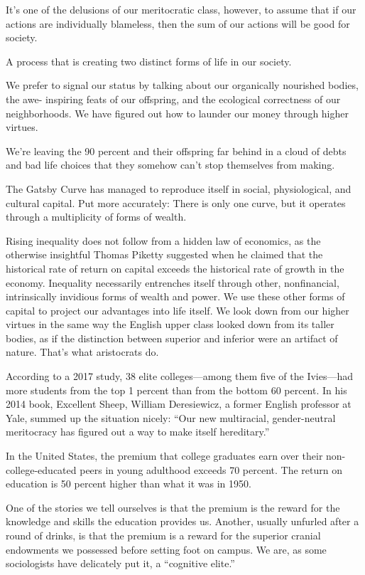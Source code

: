 \documentclass[
]{book}
\begin{document}
It's one of the
delusions of our meritocratic class, however, to assume that if our
actions are individually blameless, then the sum of our actions will be
good for society.

A process that is creating two distinct forms of life in our society.

We prefer to signal our
status by talking about our organically nourished bodies, the awe-
inspiring feats of our offspring, and the ecological correctness of our
neighborhoods. We have figured out how to launder our money
through higher virtues.

We're leaving the 90 percent and their offspring far behind in a cloud
of debts and bad life choices that they somehow can't stop themselves
from making.

The Gatsby Curve has managed to reproduce itself in social,
physiological, and cultural capital. Put more accurately: There is only
one curve, but it operates through a multiplicity of forms of wealth.

Rising inequality does not follow from a hidden law of economics, as
the otherwise insightful Thomas Piketty suggested when he claimed
that the historical rate of return on capital exceeds the historical rate
of growth in the economy. Inequality necessarily entrenches itself
through other, nonfinancial, intrinsically invidious forms of wealth
and power. We use these other forms of capital to project our
advantages into life itself. We look down from our higher virtues in
the same way the English upper class looked down from its taller
bodies, as if the distinction between superior and inferior were an
artifact of nature. That's what aristocrats do.

According to a 2017
study, 38 elite colleges---among them five of the Ivies---had more
students from the top 1 percent than from the bottom 60 percent. In
his 2014 book, Excellent Sheep, William Deresiewicz, a former
English professor at Yale, summed up the situation nicely: ``Our new
multiracial, gender-neutral meritocracy has figured out a way to make
itself hereditary.''

In the United States, the premium that college graduates earn over
their non-college-educated peers in young adulthood exceeds 70
percent. The return on education is 50 percent higher than what it
was in 1950.

One of the stories we tell ourselves is that the premium is the reward
for the knowledge and skills the education provides us. Another,
usually unfurled after a round of drinks, is that the premium is a
reward for the superior cranial endowments we possessed before
setting foot on campus. We are, as some sociologists have delicately
put it, a ``cognitive elite.''
\end{document}
